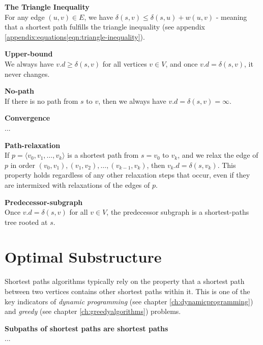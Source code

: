 \begin{description}
	\item \textbf{The Triangle Inequality} \cite[p.~671, thm. 24.10]{clrs} \\
For any edge $(u, v) \in E$, we have $\delta(s, v) \leq \delta(s, u) +
w(u, v)$ - meaning that a shortest path fulfills the triangle inequality (see
appendix \ref{appendix:equations|eqn:triangle-inequality}).

	\item \textbf{Upper-bound} \cite[p.~671-672, thm. 24.11]{clrs} \\
We always have $v.d \geq \delta(s, v)$ for all vertices $v \in V$, and once
$v.d = \delta(s, v)$, it never changes.

	\item \textbf{No-path} \cite[p.~672, thm. 24.12]{clrs} \\
If there is no path from $s$ to $v$, then we always have $v.d = \delta(s, v) =
\infty$.

	\item \textbf{Convergence} \cite[p.~672-673, thm. 24.14]{clrs} \\
...
	\item \textbf{Path-relaxation} \cite[p.~673, thm. 24.15]{clrs} \\
If $p = \langle v_0, v_1, \dots, v_k \rangle$ is a shortest path from
$s = v_0$ to $v_k$, and we relax the edge of $p$ in order $(v_0, v_1),
(v_1, v_2), \dots, (v_{k-1}, v_k)$, then $v_k.d = \delta(s, v_k)$. This
property holds regardless of any other relaxation steps that occur, even if
they are intermixed with relaxations of the edges of $p$.
	\item \textbf{Predecessor-subgraph} \cite[p.~676, thm. 24.17]{clrs} \\
Once $v.d = \delta(s, v)$ for all $v \in V$, the predecessor subgraph is a
shortest-paths tree rooted at $s$.
\end{description}

\section{Optimal Substructure}
Shortest paths algorithms typically rely on the property that a shortest path
between two vertices contains other shortest paths within it. This is one of
the key indicators of \textit{dynamic programming} (see chapter
\ref{ch:dynamicprogramming}) and \textit{greedy} (see chapter
\ref{ch:greedyalgorithms}) problems.

\begin{lemma}
	\textbf{Subpaths of shortest paths are shortest paths} \\
	...
\end{lemma} 

